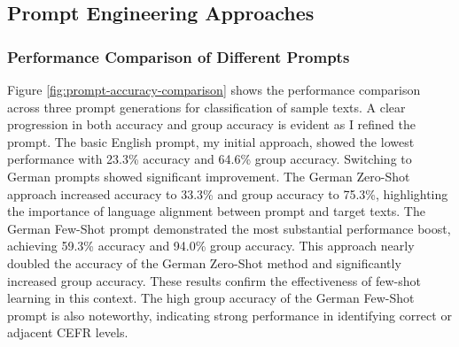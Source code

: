 \subsection{Prompt Engineering Approaches}
\label{ss:prompt_engineering_results}

\subsubsection*{Performance Comparison of Different Prompts}
\label{sss:prompt_performance_comparison}
Figure \ref{fig:prompt-accuracy-comparison} shows the performance comparison across three prompt generations for classification of sample texts. A clear progression in both accuracy and group accuracy is evident as I refined the prompt. The basic English prompt, my initial approach, showed the lowest performance with 23.3\% accuracy and 64.6\% group accuracy. Switching to German prompts showed significant improvement. The German Zero-Shot approach increased accuracy to 33.3\% and group accuracy to 75.3\%, highlighting the importance of language alignment between prompt and target texts.
The German Few-Shot prompt demonstrated the most substantial performance boost, achieving 59.3\% accuracy and 94.0\% group accuracy. This approach nearly doubled the accuracy of the German Zero-Shot method and significantly increased group accuracy.
These results confirm the effectiveness of few-shot learning in this context. The high group accuracy of the German Few-Shot prompt is also noteworthy, indicating strong performance in identifying correct or adjacent CEFR levels.

